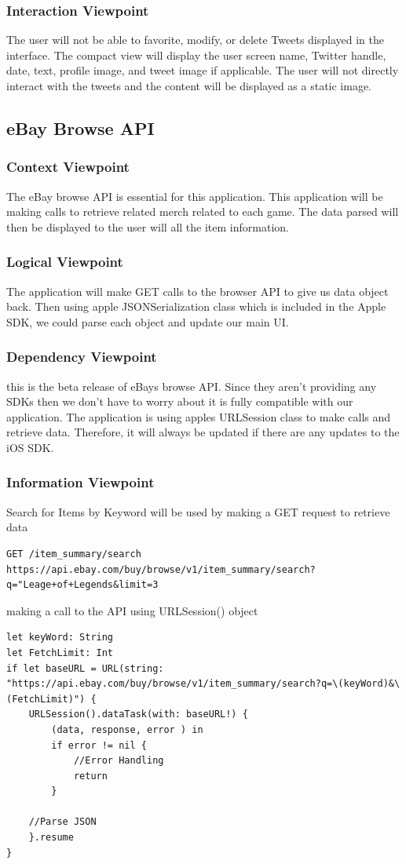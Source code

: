 \documentclass[onecolumn, draftclsnofoot,10pt, compsoc]{IEEEtran}
\begin{document}
\subsubsection{Interaction Viewpoint}
The user will not be able to favorite, modify, or delete Tweets displayed in the interface.
The compact view will display the user screen name, Twitter handle, date, text, profile image, and tweet image if applicable. The user will not directly interact with the tweets and the content will be displayed as a static image. 

\subsection{eBay Browse API}
\subsubsection{Context Viewpoint}
The eBay browse API is essential for this application. This application will be making calls to retrieve related merch related to each game. The data parsed will then be displayed to the user will all the item information. 

\subsubsection{Logical Viewpoint}
The application will make GET calls to the browser API to give us data object back. Then using apple JSONSerialization class which is included in the Apple SDK, we could parse each object and update our main UI. 

\subsubsection{Dependency Viewpoint}
this is the beta release of eBays browse API. Since they aren't providing any SDKs then we don't have to worry about it is fully compatible with our application. The application is using apples URLSession class to make calls and retrieve data. Therefore, it will always be updated if there are any updates to the iOS SDK. 

\subsubsection{Information Viewpoint}
Search for Items by Keyword will be used by making a GET request to retrieve data

\begin{verbatim}
GET /item_summary/search
https://api.ebay.com/buy/browse/v1/item_summary/search?q="Leage+of+Legends&limit=3
\end{verbatim}
making a call to the API using URLSession() object
\begin{verbatim}
let keyWord: String
let FetchLimit: Int
if let baseURL = URL(string: "https://api.ebay.com/buy/browse/v1/item_summary/search?q=\(keyWord)&\(FetchLimit)") {
    URLSession().dataTask(with: baseURL!) {
        (data, response, error ) in
        if error != nil {
            //Error Handling
            return
        }
        
    //Parse JSON
    }.resume
}
\end{verbatim}
\end{document}
